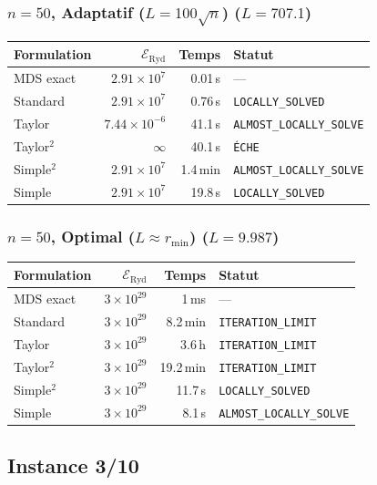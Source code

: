 \subsubsection{$n=50$, Adaptatif ($L{=}100\sqrt{n}$) ($L=707.1$)}
\begin{longtable}{@{}lrrl@{}}
  \toprule
  Formulation & $\mathcal{E}_{\mathrm{Ryd}}$ & Temps & Statut \\
  \midrule
  \endhead
  MDS exact & $2.91\times10^{7}$ & 0.01\,s & --- \\
  Standard & $2.91\times10^{7}$ & 0.76\,s & \texttt{LOCALLY\_SOLVED} \\
  Taylor & $7.44\times10^{-6}$ & 41.1\,s & \texttt{ALMOST\_LOCALLY\_SOLVE} \\
  Taylor$^2$ & $\infty$ & 40.1\,s & \texttt{ÉCHE} \\
  Simple$^2$ & $2.91\times10^{7}$ & 1.4\,min & \texttt{ALMOST\_LOCALLY\_SOLVE} \\
  Simple & $2.91\times10^{7}$ & 19.8\,s & \texttt{LOCALLY\_SOLVED} \\
  \bottomrule
\end{longtable}

\subsubsection{$n=50$, Optimal ($L{\approx}r_{\min}$) ($L=9.987$)}
\begin{longtable}{@{}lrrl@{}}
  \toprule
  Formulation & $\mathcal{E}_{\mathrm{Ryd}}$ & Temps & Statut \\
  \midrule
  \endhead
  MDS exact & $3\times10^{29}$ & 1\,ms & --- \\
  Standard & $3\times10^{29}$ & 8.2\,min & \texttt{ITERATION\_LIMIT} \\
  Taylor & $3\times10^{29}$ & 3.6\,h & \texttt{ITERATION\_LIMIT} \\
  Taylor$^2$ & $3\times10^{29}$ & 19.2\,min & \texttt{ITERATION\_LIMIT} \\
  Simple$^2$ & $3\times10^{29}$ & 11.7\,s & \texttt{LOCALLY\_SOLVED} \\
  Simple & $3\times10^{29}$ & 8.1\,s & \texttt{ALMOST\_LOCALLY\_SOLVE} \\
  \bottomrule
\end{longtable}

\subsection{Instance 3/10}
